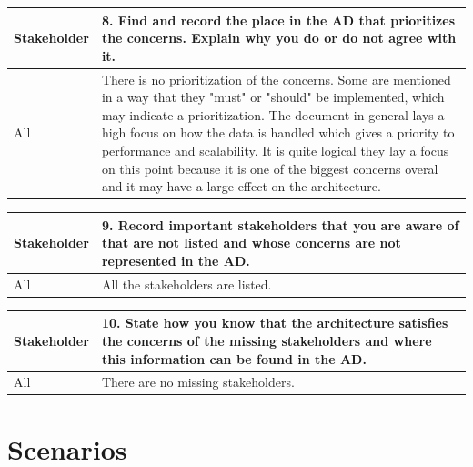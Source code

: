 \documentclass{article}
\begin{document}
\begin{tabularx}{\textwidth}{| l | X |}
  \hline
  \textbf{Stakeholder} & \textbf{8. Find and record the place in the AD that prioritizes the concerns. Explain why you do or do not agree with it.} \\
  \hline
  All & There is no prioritization of the concerns. Some are mentioned in a way that they "must" or "should" be implemented, which may indicate a prioritization. The document in general lays a high focus on how the data is handled which gives a priority to performance and scalability. It is quite logical they lay a focus on this point because it is one of the biggest concerns overal and it may have a large effect on the architecture. \\
  \hline
\end{tabularx}

\begin{tabularx}{\textwidth}{| l | X |}
  \hline
  \textbf{Stakeholder} & \textbf{9. Record important stakeholders that you are aware of that are not listed and whose concerns are not represented in the AD.} \\
  \hline
  All & All the stakeholders are listed. \\
  \hline
\end{tabularx}

\begin{tabularx}{\textwidth}{| l | X |}
  \hline
  \textbf{Stakeholder} & \textbf{10. State how you know that the architecture satisfies the concerns of the missing stakeholders and where this information can be found in the AD.} \\
  \hline
  All & There are no missing stakeholders. \\
  \hline
\end{tabularx}


\newpage

\section{Scenarios}
\end{document}
